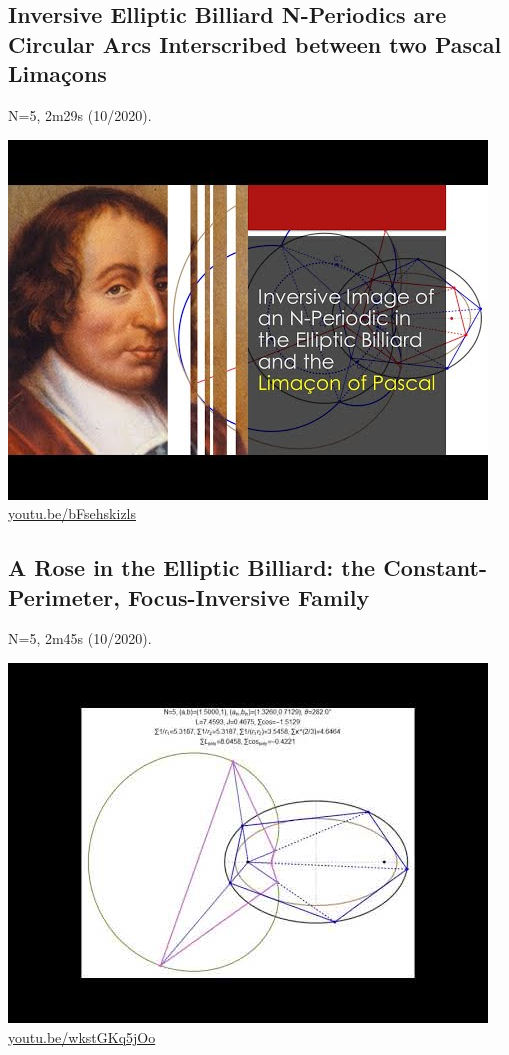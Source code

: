 \documentclass[12pt]{amsart}
\begin{document}
\subsection{Inversive Elliptic Billiard N-Periodics are Circular Arcs Interscribed between two Pascal Limaçons}
\label{vid:bFsehskizls}
\noindent N=5, 2m29s (10/2020). 
\begin{center}\includegraphics[width=.5\textwidth]{pics/bFsehskizls.jpg} \\ 
\href{https://youtu.be/bFsehskizls}{\url{youtu.be/bFsehskizls}}\end{center}
% 
\subsection{A Rose in the Elliptic Billiard: the Constant-Perimeter, Focus-Inversive Family}
\label{vid:wkstGKq5jOo}
\noindent N=5, 2m45s (10/2020). 
\begin{center}\includegraphics[width=.5\textwidth]{pics/wkstGKq5jOo.jpg} \\ 
\href{https://youtu.be/wkstGKq5jOo}{\url{youtu.be/wkstGKq5jOo}}\end{center}
% 
\end{document}
